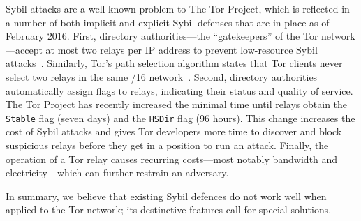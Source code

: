 Sybil attacks are a well-known problem to The Tor Project, which is reflected in
a number of both implicit and explicit Sybil defenses that are in place as of
February 2016.  First, directory authorities---the ``gatekeepers'' of the Tor
network---accept at most two relays per IP address to prevent low-resource Sybil
attacks~\cite{Bauer2007a,Bauer2007b}.  Similarly, Tor's path selection algorithm
states that Tor clients never select two relays in the same /16
network~\cite{path-spec}.  Second, directory authorities automatically assign
flags to relays, indicating their status and quality of service.  The Tor
Project has recently increased the minimal time until relays obtain the
\texttt{Stable} flag (seven days) and the \texttt{HSDir} flag (96 hours).  This
change increases the cost of Sybil attacks and gives Tor developers more time to
discover and block suspicious relays before they get in a position to run an
attack.  Finally, the operation of a Tor relay causes recurring costs---most
notably bandwidth and electricity---which can further restrain an adversary.

In summary, we believe that existing Sybil defences do not work well when
applied to the Tor network; its destinctive features call for special solutions.
